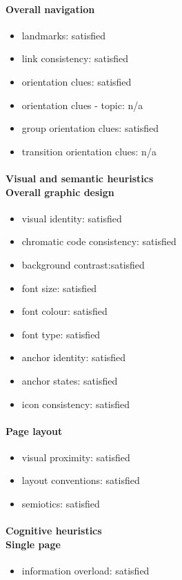 \begin{enumerate}
	\paragraph*{Overall navigation}
	\begin{itemize}
		\item landmarks: satisfied
		\item link consistency: satisfied
		\item orientation clues: satisfied
		\item orientation clues - topic: n/a
		\item group orientation clues: satisfied
		\item transition orientation clues: n/a
	\end{itemize}	
	
	\paragraph*{Visual and semantic heuristics \\ Overall graphic design }
	\begin{itemize}
		\item visual identity: satisfied
		\item chromatic code consistency: satisfied
		\item background contrast:satisfied
		\item font size: satisfied
		\item font colour: satisfied
		\item font type: satisfied
		\item anchor identity: satisfied
		\item anchor states: satisfied
		\item icon consistency: satisfied
	\end{itemize}
	
	\paragraph*{Page layout}
	\begin{itemize}
		\item visual proximity: satisfied
		\item layout conventions: satisfied
		\item semiotics: satisfied
	\end{itemize}	
	
	\paragraph*{Cognitive heuristics \\ Single page}
	\begin{itemize}
		\item information overload: satisfied
	\end{itemize}	
	

\end{enumerate}
